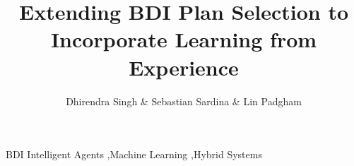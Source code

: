 \documentclass[preprint,12pt]{elsarticle}
\begin{document}
\begin{frontmatter}



\title{Extending BDI Plan Selection to Incorporate Learning from Experience}


\author{Dhirendra Singh \& Sebastian Sardina \& Lin Padgham}
\address{RMIT University, Melbourne, Australia}
  
\begin{abstract}

\end{abstract}

\begin{keyword}

BDI Intelligent Agents \sep Machine Learning \sep Hybrid Systems




\end{keyword}

\end{frontmatter}





\end{document}
